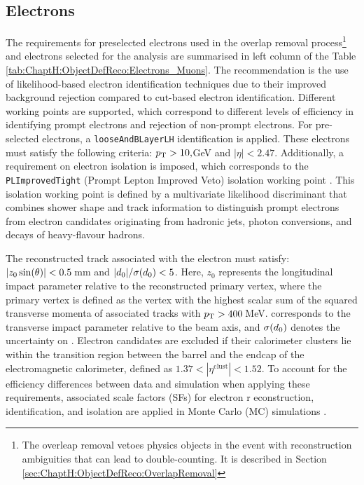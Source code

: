 \subsection{Electrons}
\label{sec:ChaptH:ObjectDefReco:electron}
The requirements for preselected electrons used in the overlap removal process\footnote{The 
overleap removal vetoes physics objects in the event with reconstruction ambiguities that can lead 
to double-counting.  It is described in Section \ref{sec:ChaptH:ObjectDefReco:OverlapRemoval}}
and electrons selected for the analysis are summarised in left column of 
the Table \ref{tab:ChaptH:ObjectDefReco:Electrons_Muons}.
The recommendation is the use of likelihood-based electron identification 
techniques \cite{PERF-2017-01,EGAM-2018-01} due to their improved 
background rejection compared to cut-based electron identification. 
Different working points are supported, which correspond to different levels 
of efficiency in identifying prompt electrons and rejection of non-prompt electrons. 
For pre-selected electrons, a \texttt{looseAndBLayerLH} identification is applied.
These electrons must satisfy the following criteria: $p_{\text{T}} > 10,$GeV and $|\eta| < 2.47$. 
Additionally, a requirement on electron isolation is imposed, which corresponds to the 
\texttt{PLImprovedTight} (Prompt Lepton Improved Veto) isolation working 
point \cite{twiki-IFF,twiki-ISOWP,PLIV}. This isolation working point is defined by a 
multivariate likelihood discriminant that combines shower shape and track information 
to distinguish prompt electrons from electron candidates originating from hadronic jets, 
photon conversions, and decays of heavy-flavour hadrons.

The reconstructed track associated with the electron must satisfy: $|z_{0} \sin(\theta)| < 0.5\,$mm 
and $|d_{0}| / \sigma(d_{0}) < 5$. Here, $z_{0}$ represents the longitudinal impact 
parameter relative to the reconstructed primary vertex, where the primary vertex is 
defined as the vertex with the highest scalar sum of the squared transverse momenta 
of associated tracks with $p_{\text{T}} > 400\,$MeV. \dzero corresponds to the transverse impact 
parameter relative to the beam axis, and $\sigma(d_{0})$ denotes the uncertainty on \dzero.
Electron candidates are excluded if their calorimeter clusters lie within the transition region 
between the barrel and the endcap of the electromagnetic calorimeter, defined as 
$1.37 < |\eta^\mathrm{clust}| < 1.52$. To account for the efficiency differences between data 
and simulation when applying these requirements, associated scale factors (SFs) for electron r
econstruction, identification, and isolation are applied in Monte Carlo (MC) simulations \cite{egammaRecommendations}.

